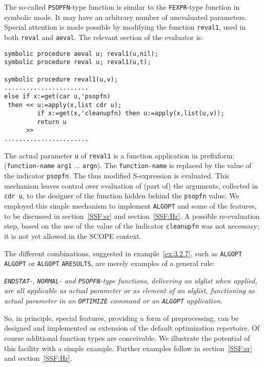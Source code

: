 The so-called {\tt PSOPFN}-type function is similar to the {\tt FEXPR}-type
function in symbolic mode. It may have an arbitrary number of unevaluated
parameters.
Special attention is made possible by modifying the function {\tt reval1}, used
in both {\tt reval} and {\tt aeval}. The relevant section of the evaluator is:
{\small
\begin{verbatim}
symbolic procedure aeval u; reval1(u,nil);
symbolic procedure reval u; reval1(u,t);

symbolic procedure reval1(u,v);
.......................
else if x:=get(car u,'psopfn)
 then << u:=apply(x,list cdr u);
         if x:=get(x,'cleanupfn) then u:=apply(x,list(u,v));
         return u
      >>
.......................
\end{verbatim}}
The actual parameter {\tt u} of {\tt reval1} is a function application in
prefixform: ({\tt function-name} {\tt arg1} ... {\tt argn}).
The {\tt function-name} is replaced by the value of the indicator {\tt psopfn}.
The thus modified S-expression is evaluated. This mechanism leaves control
over evaluation of (part of) the arguments, collected in {\tt cdr u}, to the
designer of the function hidden behind the {\tt psopfn} value. We employed
this simple mechanism to implement {\tt ALGOPT} and some of the features,
to be discussed in section~\ref{SSF:sr} and section~\ref{SSF:Hr}.
A possible re-evaluation step, based on the use of the
value of the indicator {\tt cleanupfn} was not necessary; it is not yet
allowed in the SCOPE context.

The different combinations, suggested in example~\ref{ex:3.2.7}, such as
{\tt ALGOPT} {\tt ALGOPT} or {\tt ALGOPT} {\tt ARESULTS}, are merely examples
of a general rule:

{\em {\tt ENDSTAT}-, {\tt NORMAL}- and {\tt PSOPFN}-type functions, delivering
an alglist when applied, are all applicable as actual parameter or
as element of an alglist, functioning as actual parameter in an
{\tt OPTIMIZE} command or an {\tt ALGOPT} application. }

So, in principle, special features, providing a form of preprocessing, can be
designed and implemented as extension of the default optimization repertoire.
Of course additional function types are conceivable.
We illustrate the potential of this facility with a simple example.
Further examples follow
in section~\ref{SSF:sr} and section~\ref{SSF:Hr}.

